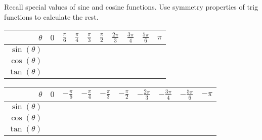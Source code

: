\documentclass[../main.tex]{subfiles}
\begin{document}
\begin{example}
  Recall special values of sine and cosine functions. Use symmetry properties of trig functions to calculate the rest.

  \begin{tabular}{r|p{1cm}|p{1cm}|p{1cm}|p{1cm}|p{1cm}|p{1cm}|p{1cm}|p{1cm}|p{1cm}}
    \(\theta\) & \(0\) & \(\frac{\pi}{6}\) & \(\frac{\pi}{4}\) & \(\frac{\pi}{3}\) & \(\frac{\pi}{2}\) & \(\frac{2\pi}{3}\) & \(\frac{3\pi}{4}\) & \(\frac{5\pi}{6}\) & \(\pi\) \\\midrule
    \(\sin(\theta)\) &&&&&&&&&\\[3ex]\midrule
    \(\cos(\theta)\) &&&&&&&&&\\[3ex]\midrule
    \(\tan(\theta)\) &&&&&&&&&\\[3ex]
  \end{tabular}

  \begin{tabular}{r|p{1cm}|p{1cm}|p{1cm}|p{1cm}|p{1cm}|p{1cm}|p{1cm}|p{1cm}|p{1cm}}
    \(\theta\) & \(0\) & \(-\frac{\pi}{6}\) & \(-\frac{\pi}{4}\) & \(-\frac{\pi}{3}\) & \(-\frac{\pi}{2}\) & \(-\frac{2\pi}{3}\) & \(-\frac{3\pi}{4}\) & \(-\frac{5\pi}{6}\) & \(-\pi\) \\\midrule
    \(\sin(\theta)\) &&&&&&&&&\\[3ex]\midrule
    \(\cos(\theta)\) &&&&&&&&&\\[3ex]\midrule
    \(\tan(\theta)\) &&&&&&&&&\\[3ex]
  \end{tabular}
\end{example}
\vfill{}

\clearpage
\end{document}
